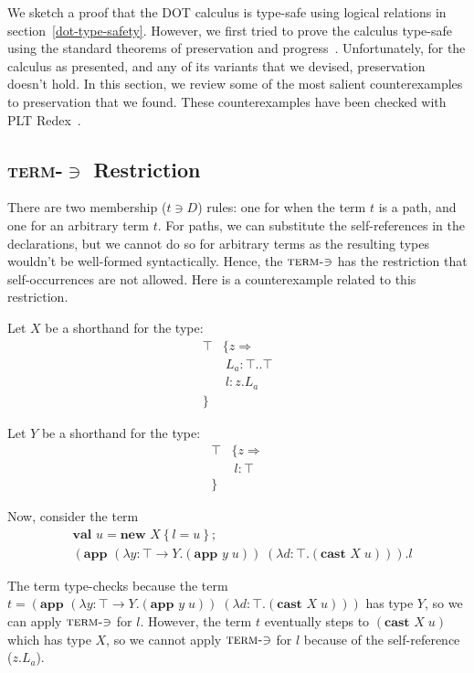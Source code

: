 \documentclass[9pt]{sigplanconf}
\newcommand{\tfun}{\rightarrow}
\newcommand{\mlrefine}[2]{\{#1 \Rightarrow #2 \}}
\newcommand{\ldefs}[1]{\left\{#1\right\}}
\newcommand{\abs}[3]{\lambda #1\!:\!#2.#3}
\newcommand{\mlnew}[3]{\textbf{val }#1 = \textbf{new }#2 ;\;\\&#3}
\newcommand{\Ldecl}[3]{#1 : #2..#3}%
\newcommand{\ldecl}[2]{#1 : #2}
\newcommand{\Top}{\top}%
\newcommand{\app}[2]{(\textbf{app }#1\;#2)}
\newcommand{\cast}[2]{(\textbf{cast }#1\;#2)}
\begin{document}
We sketch a proof that the DOT calculus is type-safe using logical
relations in section~\ref{dot-type-safety}. However, we first tried to
prove the calculus type-safe using the standard theorems of
preservation and progress~\cite{soundness,tapl}. Unfortunately, for
the calculus as presented, and any of its variants that we devised,
preservation doesn't hold. In this section, we review some of the most
salient counterexamples to preservation that we found. These
counterexamples have been checked with PLT Redex~\cite{plt_redex}.

\subsection{\texorpdfstring{\textsc{term-$\ni$}}{Term-Mem} Restriction}\label{term_mem}

There are two membership ($t \ni D$) rules: one for when the term $t$
is a path, and one for an arbitrary term $t$. For paths, we can
substitute the self-references in the declarations, but we cannot do
so for arbitrary terms as the resulting types wouldn't be well-formed
syntactically. Hence, the $\textsc{term-$\ni$}$ has the restriction
that self-occurrences are not allowed. Here is a counterexample related
to this restriction.

Let $X$ be a shorthand for the type:
\begin{align*}
\Top & \mlrefine z {\\
&\ \Ldecl {L_a} \Top \Top\\
&\ \ldecl l {z.L_a}\\
}&
\end{align*}

Let $Y$ be a shorthand for the type:
\begin{align*}
\Top & \mlrefine z {\\
&\ \ldecl l \Top\\
}&
\end{align*}

Now, consider the term
\begin{align*}
&\mlnew u {X \ldefs{ l = u }}{
\app {(\abs y {\Top \tfun Y} {\app y u})} {(\abs d \Top {\cast X u})}.l
}
\end{align*}

The term type-checks because the term $t=\app {(\abs y {\Top \tfun Y}
  {\app y u})} {(\abs d \Top {\cast X u})}$ has type
$Y$, so we can apply $\textsc{term-$\ni$}$ for $l$. However, the term
$t$ eventually steps to ${\cast X u}$ which has type $X$,
so we cannot apply $\textsc{term-$\ni$}$ for $l$ because of the
self-reference ($z.L_a$).
\end{document}
